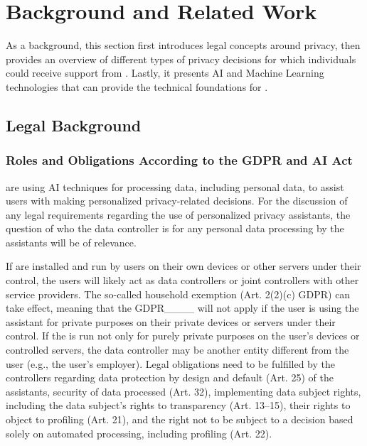 \section{Background and Related Work}
\label{sec:background}
As a background, this section first introduces legal concepts around privacy, then provides an overview of different types of privacy decisions for which individuals could receive support from \PPAs. 
Lastly, it presents AI and Machine Learning technologies that can provide the technical foundations for \PPAs.

\subsection{Legal Background} 
\label{subsec:legal}

\subsubsection{Roles and Obligations According to the GDPR and AI Act}
\label{legal_background}
\PPAs are using AI techniques for processing data, including personal data, to assist users with making personalized privacy-related decisions. 
For the discussion of any legal requirements regarding the use of personalized privacy assistants, the question of who the data controller is for any personal data processing by the assistants will be of relevance.

If \PPAs are installed and run by users on their own devices or other servers under their control, the users will likely act as data controllers or joint controllers with other service providers. The so-called household exemption (Art. 2(2)(c) GDPR) can take effect, meaning that the GDPR____ will not apply if the user is using the assistant for private purposes on their private devices or servers under their control.
If the \PPA is run not only for purely private purposes on the user's devices or controlled servers, the data controller may be another entity different from the user (e.g., the user's employer). Legal obligations need to be fulfilled by the controllers regarding data protection by design and default (Art. 25) of the assistants, security of data processed (Art. 32), implementing data subject rights, including the data subject's rights to transparency (Art. 13--15), their rights to object to profiling (Art. 21), and the right not to be subject to a decision based solely on automated processing, including profiling (Art. 22).

